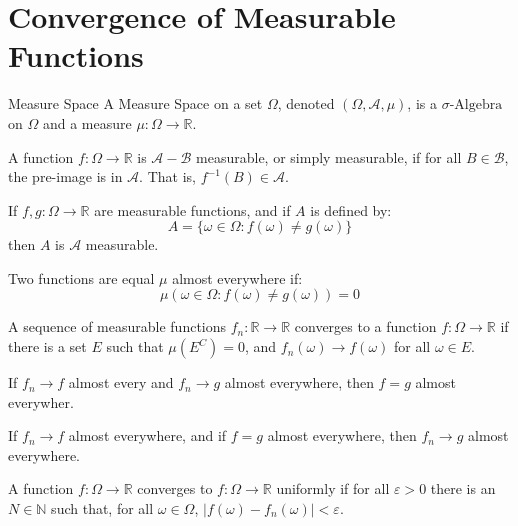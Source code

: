\section{Convergence of Measurable Functions}
    \begin{ldefinition}{Measure Space}
        A Measure Space on a set $\Omega$, denoted $(\Omega,\mathcal{A},\mu)$,
        is a $\sigma\textrm{-Algebra}$ on $\Omega$ and a measure
        $\mu:\Omega\rightarrow\mathbb{R}$.
    \end{ldefinition}
    A function $f:\Omega\rightarrow\mathbb{R}$ is $\mathcal{A}-\mathcal{B}$
    measurable, or simply measurable, if for all $B\in\mathcal{B}$, the
    pre-image is in $\mathcal{A}$. That is, $f^{-1}(B)\in\mathcal{A}$.
    \begin{theorem}
        If $f,g:\Omega\rightarrow\mathbb{R}$ are measurable functions, and if
        $A$ is defined by:
        \begin{equation}
            A=\{\omega\in\Omega:f(\omega)\ne{g}(\omega)\}
        \end{equation}
        then $A$ is $\mathcal{A}$ measurable.
    \end{theorem}
    \begin{definition}
        Two functions are equal $\mu$ almost everywhere if:
        \begin{equation}
            \mu(\omega\in\Omega:f(\omega)\ne{g}(\omega))=0
        \end{equation}
    \end{definition}
    \begin{definition}
        A sequence of measurable functions
        $f_{n}:\mathbb{R}\rightarrow\mathbb{R}$ converges
        to a function $f:\Omega\rightarrow\mathbb{R}$
        if there is a set $E$ such that $\mu(E^{C})=0$,
        and $f_{n}(\omega)\rightarrow{f}(\omega)$ for all
        $\omega\in{E}$.
    \end{definition}
    \begin{theorem}
        If $f_{n}\rightarrow{f}$ almost every and
        $f_{n}\rightarrow{g}$ almost everywhere, then
        $f=g$ almost everywher.
    \end{theorem}
    \begin{theorem}
        If $f_{n}\rightarrow{f}$ almost everywhere, and
        if $f=g$ almost everywhere, then
        $f_{n}\rightarrow{g}$ almost everywhere.
    \end{theorem}
    \begin{definition}
        A function $f:\Omega\rightarrow\mathbb{R}$
        converges to $f:\Omega\rightarrow\mathbb{R}$
        uniformly if for all $\varepsilon>0$ there is
        an $N\in\mathbb{N}$ such that, for all
        $\omega\in\Omega$,
        $|f(\omega)-f_{n}(\omega)|<\varepsilon$.
    \end{definition}
